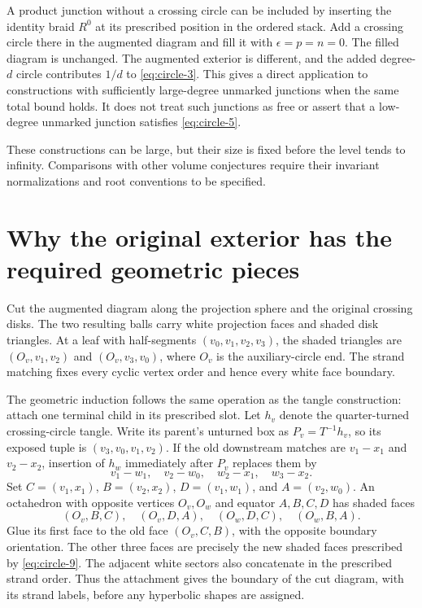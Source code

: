 A product junction without a crossing circle can be included by
inserting the identity braid \(R^0\) at its prescribed position in the ordered
stack. Add a crossing circle there in the augmented diagram and fill it
with \(\epsilon=p=n=0\). The filled diagram is unchanged. The augmented
exterior is different, and the added degree-\(d\) circle contributes
\(1/d\) to \eqref{eq:circle-3}. This gives a direct application to constructions with
sufficiently large-degree unmarked junctions when the same total bound
holds. It does not treat such junctions as free or assert that a
low-degree unmarked junction satisfies \eqref{eq:circle-5}.

These constructions can be large, but their size is fixed before the
level tends to infinity. Comparisons with other volume conjectures require their invariant
normalizations and root conventions to be specified.

\section{Why the original exterior has the required geometric
pieces}\label{sec:circle-why-the-original-exterior-has-the-required-geometric-pieces}

Cut the augmented diagram along the projection sphere and the original
crossing disks. The two resulting balls carry white projection faces and
shaded disk triangles. At a leaf with half-segments
\((v_0,v_1,v_2,v_3)\), the shaded triangles are \((O_v,v_1,v_2)\) and
\((O_v,v_3,v_0)\), where \(O_v\) is the auxiliary-circle end. The
strand matching fixes every cyclic vertex order and hence every
white face boundary.

The geometric induction follows the same operation as the tangle
construction: attach one terminal child in its prescribed slot.
Let \(h_v\) denote the quarter-turned crossing-circle tangle. Write
its parent's unturned box as \(P_v=T^{-1}h_v\), so its exposed
tuple is \((v_3,v_0,v_1,v_2)\). If the old downstream matches are
\(v_1-x_1\) and \(v_2-x_2\), insertion of \(h_w\) immediately after
\(P_v\) replaces them by \begin{equation}
 v_1-w_1,\quad v_2-w_0,\quad w_2-x_1,\quad w_3-x_2.
 \label{eq:circle-9}
\end{equation} Set \(C=(v_1,x_1)\), \(B=(v_2,x_2)\), \(D=(v_1,w_1)\), and
\(A=(v_2,w_0)\). An octahedron with opposite vertices \(O_v,O_w\) and
equator \(A,B,C,D\) has shaded faces \begin{equation}
 (O_v,B,C),\quad(O_v,D,A),\quad(O_w,D,C),\quad(O_w,B,A).
 \label{eq:circle-10}
\end{equation} Glue its first face to the old face \((O_v,C,B)\), with the opposite
boundary orientation. The other three faces are precisely the new shaded
faces prescribed by \eqref{eq:circle-9}. The adjacent white sectors also concatenate in
the prescribed strand order. Thus the attachment gives the boundary of the cut diagram, with
its strand labels, before any hyperbolic shapes are assigned.

